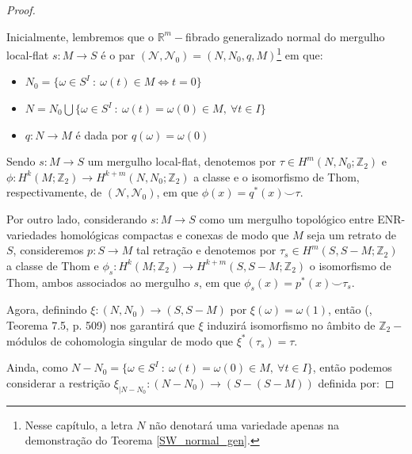 \documentclass[12pt,oneside]{book} %
\newcommand{\R}{\mathbb{R}}
\newcommand{\Z}{\mathbb{Z}}
\newcommand{\ccup}{\smile}
\begin{document}
\begin{proof}

\

\par Inicialmente, lembremos que o $\R^{m}-$fibrado generalizado normal do mergulho local-flat $s:M\to S$ é o par $(\mathcal{N},\mathcal{N}_{0})=(N,N_{0},q,M)$\footnote{Nesse capítulo, a letra $N$ não denotará uma variedade apenas na demonstração do Teorema \ref{SW_normal_gen}.} em que:

	\begin{itemize}
		\item $N_{0}=\{ \omega\in S^{I} \ : \ \omega(t)\in M \Leftrightarrow t=0 \}$
		\item $N=N_{0}\bigcup \{ \omega\in S^{I} \ : \ \omega(t)=\omega(0)\in M, \ \forall t\in I \}$
		\item $q:N\to M$ é dada por $q(\omega)=\omega(0)$
	\end{itemize}

\par Sendo $s:M\to S$ um mergulho local-flat, denotemos por $\tau\in H^{m}(N,N_{0};\Z_{2})$ e $\phi:H^{k}(M;\Z_{2})\to H^{k+m}(N,N_{0};\Z_{2})$ a classe e o isomorfismo de Thom, respectivamente, de $(\mathcal{N},\mathcal{N}_{0})$, em que $\phi(x)=q^{*}(x)\ccup \tau$.

\par Por outro lado, considerando $s:M\to S$ como um mergulho topológico entre ENR-variedades homológicas compactas e conexas de modo que $M$ seja um retrato de $S$, consideremos $p:S\to M$ tal retração e denotemos por $\tau_{s}\in H^{m}(S,S-M;\Z_{2})$ a classe de Thom e $\phi_{s}:H^{k}(M;\Z_{2})\to H^{k+m}(S,S-M;\Z_{2})$ o isomorfismo de Thom, ambos associados ao mergulho $s$, em que $\phi_{s}(x)=p^{*}(x)\ccup\tau_{s}$.

\par Agora, definindo $\xi:(N,N_{0})\to (S,S-M)$ por $\xi(\omega)=\omega(1)$, então (\cite{fadell_1}, Teorema 7.5, p. 509) nos garantirá que $\xi$ induzirá isomorfismo no âmbito de $\Z_{2}-$módulos de cohomologia singular de modo que $\xi^{*}(\tau_{s})=\tau$.

\par Ainda, como $N-N_{0}=\{ \omega\in S^{I} \ : \ \omega(t)=\omega(0)\in M, \ \forall t\in I \}$, então podemos considerar a restrição $\xi_{|N-N_{0}}:(N-N_{0})\to (S-(S-M))$ definida por:\newline


\end{proof}
\end{document}
